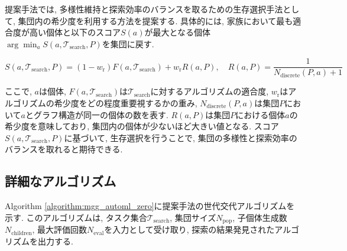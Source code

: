 \documentclass[11pt,oneside,openany,report]{jsbook}
\begin{document}
提案手法では, 多様性維持と探索効率のバランスを取るための生存選択手法として, 集団内の希少度を利用する方法を提案する. 具体的には, 家族において最も適合度が高い個体と以下のスコア$S(a)$が最大となる個体$\arg \min_a S(a, \mathcal{T}_\mathrm{search}, P)$を集団に戻す.

$$
 S(a, \mathcal{T}_\mathrm{search}, P) = (1-w_\mathrm{r}) F(a, \mathcal{T}_\mathrm{search}) + w_\mathrm{r} R(a, P), \quad
 R(a, P) = \frac{1}{N_{\mathrm{discrete}}(P, a) + 1}
$$

\noindent
ここで, $a$は個体, $F(a, \mathcal{T}_\mathrm{search})$は$\mathcal{T}_\mathrm{search}$に対するアルゴリズムの適合度, $w_\mathrm{r}$はアルゴリズムの希少度をどの程度重要視するかの重み, $N_\mathrm{discrete}(P, a)$は集団$P$において$a$とグラフ構造が同一の個体の数を表す. $R(a, P)$は集団$P$における個体$a$の希少度を意味しており, 集団内の個体が少ないほど大きい値となる. スコア$S(a, \mathcal{T}_\mathrm{search}, P)$に基づいて, 生存選択を行うことで, 集団の多様性と探索効率のバランスを取れると期待できる.

\subsection{詳細なアルゴリズム}
Algorithm \ref{algorithm:mgg_automl_zero}に提案手法の世代交代アルゴリズムを示す. このアルゴリズムは, タスク集合$\mathcal{T}_\mathrm{search}$, 集団サイズ$N_\mathrm{pop}$, 子個体生成数$N_\mathrm{children}$, 最大評価回数$ N_\mathrm{eval}$を入力として受け取り, 探索の結果発見されたアルゴリズムを出力する.
\end{document}
